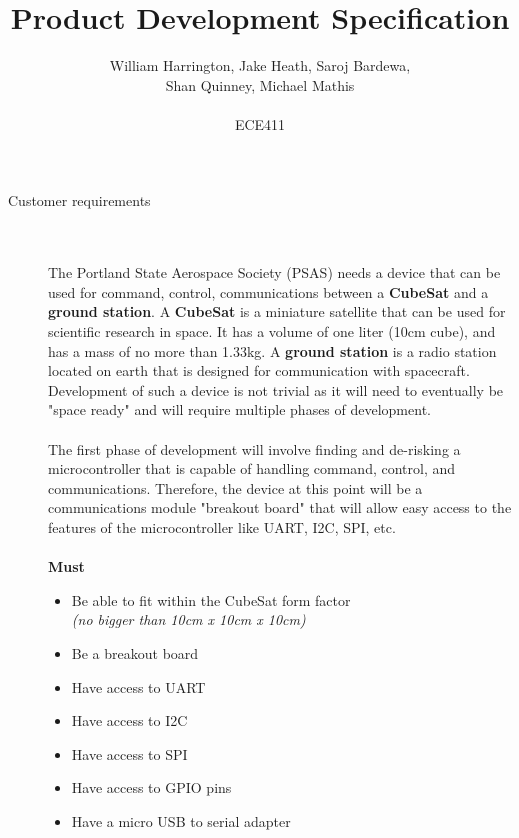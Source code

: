 \documentclass[12pt]{article}
\begin{document}
\title{Product Development Specification}%
\author{William Harrington, Jake Heath, Saroj Bardewa,\\ Shan Quinney, Michael Mathis\\ \\ %
ECE411} %
 
\maketitle
 \small
\begin{description} 
	\item[Customer requirements] \hfill \\ \\
		The Portland State Aerospace Society (PSAS) needs a device that can be used for command, control, communications between a \textbf{CubeSat} and a \textbf{ground station}.
		A \textbf{CubeSat} is a miniature satellite that can be used for scientific research in space. It has a volume of one liter (10cm cube), and has a mass of no more than 1.33kg. 
		A \textbf{ground station} is a radio station located on earth that is designed for communication with spacecraft.
		Development of such a device is not trivial as it will need to eventually be "space ready" and will require multiple phases of development. \hfill \\ \\
		The first phase of development will involve finding and de-risking a microcontroller that is capable of handling command, control, and communications. 
		Therefore, the device at this point will be a communications module "breakout board" that will allow easy access to the features of the microcontroller like UART, I2C, SPI, etc. 
		\hfill \\ \\
		\newpage
		\textbf{Must}
		\begin{itemize}
			\item{Be able to fit within the CubeSat form factor\\ \textit{(no bigger than 10cm x 10cm x 10cm)}}
			\item{Be a breakout board}
			\item{Have access to UART}
			\item{Have access to I2C}
			\item{Have access to SPI}
			\item{Have access to GPIO pins}
			\item{Have a micro USB to serial adapter}

\end{itemize}
\end{description}
\end{document}
